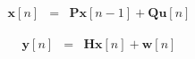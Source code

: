 \documentclass[a4paper,11pt,fleqn]{article}
\begin{document}
\begin{equation}
\begin{array}{rcl}
\mathbf{x}[n]&=&\mathbf{P}\mathbf{x}[n-1] +
\mathbf{Q}\mathbf{u}[n]
\end{array} \label{KFE_SF_X}
\end{equation}

\begin{equation}
\begin{array}{rcl}
\mathbf{y}[n]&=&\mathbf{H}\mathbf{x}[n] + \mathbf{w}[n]
\end{array} \label{KFE_SF_Y}
\end{equation}


\pagebreak



\end{document}
